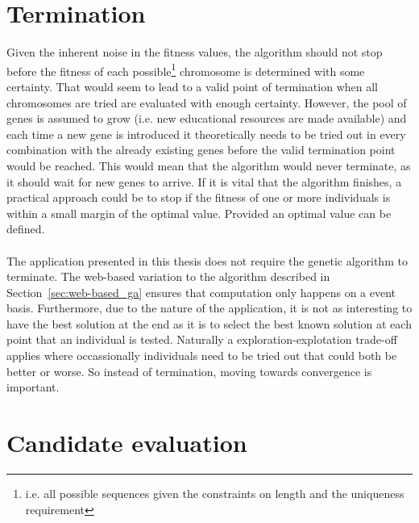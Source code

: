 \section{Termination}
\label{sec:approach_termination}
Given the inherent noise in the fitness values, the algorithm should not stop
before the fitness of each possible\footnote{i.e. all possible sequences given
the constraints on length and the uniqueness requirement} chromosome is determined
with some certainty. That would seem to lead to a valid point of termination
when all chromosomes are tried are evaluated with enough certainty. However,
the pool of genes is assumed to grow (i.e. new educational resources are made
available) and each time a new gene is introduced it theoretically needs to be
tried out in every combination with the already existing genes before the valid
termination point would be reached. This would mean that the algorithm would
never terminate, as it should wait for new genes to arrive. If it is vital that
the algorithm finishes, a practical approach could be to stop if the fitness of
one or more individuals is within a small margin of the optimal value. Provided
an optimal value can be defined.\\\\
\noindent
The application presented in this thesis does not require the genetic algorithm
to terminate. The web-based variation to the algorithm described in
Section~\ref{sec:web-based_ga} ensures that computation only happens on a event
basis. Furthermore, due to the nature of the application, it is not
as interesting to have the best solution at the end as it is to select the best
known solution at each point that an individual is tested. Naturally a
exploration-explotation trade-off applies where occassionally individuals need
to be tried out that could both be better or worse. So instead of termination,
moving towards convergence is important.

\section{Candidate evaluation}
\label{sec:approach_evaluation}
